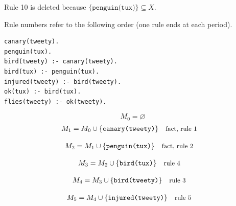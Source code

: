 \documentclass[a4paper,11pt]{article}
\newif\ifexplain
\newcommand{\explain}[1]{\ifexplain\begin{erklbox}#1\end{erklbox}\fi}
\newcommand{\why}[1]{\text{\small #1}}
\newcommand{\at}[1]{\texttt{#1}}
\begin{document}
Rule 10 is deleted because $\{\at{penguin(tux)}\}\subseteq X$.

Rule numbers refer to the following order (one rule ends at each period).
\begin{small}
\begin{verbatim}
canary(tweety).
penguin(tux).
bird(tweety) :- canary(tweety).
bird(tux) :- penguin(tux).
injured(tweety) :- bird(tweety).
ok(tux) :- bird(tux).
flies(tweety) :- ok(tweety).
\end{verbatim}
\end{small}
\explain{Beim Redukt bleibt die Kandidatenmenge fest. Wir entscheiden zuerst, welche Regeln wegfallen. Erst danach berechnen wir aus den verbleibenden positiven Regeln die kleinste abgeschlossene Menge. Ein Modell allein reicht nicht: Diese Menge muss genau der Kandidat sein.}
\[
M_0=\varnothing
\]
\begin{align*}
M_{1} &= M_{0}\cup \{\at{canary(tweety)}\} && \why{fact, rule 1}
\end{align*}
\explain{Diese Regel hat keinen Körper. Ihr Kopf $\at{canary(tweety)}$ ist damit ein Fakt und muss in die Menge.}
\begin{align*}
M_{2} &= M_{1}\cup \{\at{penguin(tux)}\} && \why{fact, rule 2}
\end{align*}
\explain{Diese Regel hat keinen Körper. Ihr Kopf $\at{penguin(tux)}$ ist damit ein Fakt und muss in die Menge.}
\begin{align*}
M_{3} &= M_{2}\cup \{\at{bird(tux)}\} && \why{rule 4}
\end{align*}
\explain{Für $\at{bird(tux)}$ brauchen wir $\at{penguin(tux)}$. Weil diese Voraussetzungen bereits hergeleitet sind, dürfen wir den Regelkopf jetzt aufnehmen und alle bisherigen Atome behalten; bei einer fehlenden Voraussetzung würde diese Regel dagegen noch nichts beitragen.}
\begin{align*}
M_{4} &= M_{3}\cup \{\at{bird(tweety)}\} && \why{rule 3}
\end{align*}
\explain{Für $\at{bird(tweety)}$ brauchen wir $\at{canary(tweety)}$. Weil diese Voraussetzungen bereits hergeleitet sind, dürfen wir den Regelkopf jetzt aufnehmen und alle bisherigen Atome behalten; bei einer fehlenden Voraussetzung würde diese Regel dagegen noch nichts beitragen.}
\begin{align*}
M_{5} &= M_{4}\cup \{\at{injured(tweety)}\} && \why{rule 5}
\end{align*}
\explain{Für $\at{injured(tweety)}$ brauchen wir $\at{bird(tweety)}$. Weil diese Voraussetzungen bereits hergeleitet sind, dürfen wir den Regelkopf jetzt aufnehmen und alle bisherigen Atome behalten; bei einer fehlenden Voraussetzung würde diese Regel dagegen noch nichts beitragen.}
\end{document}
